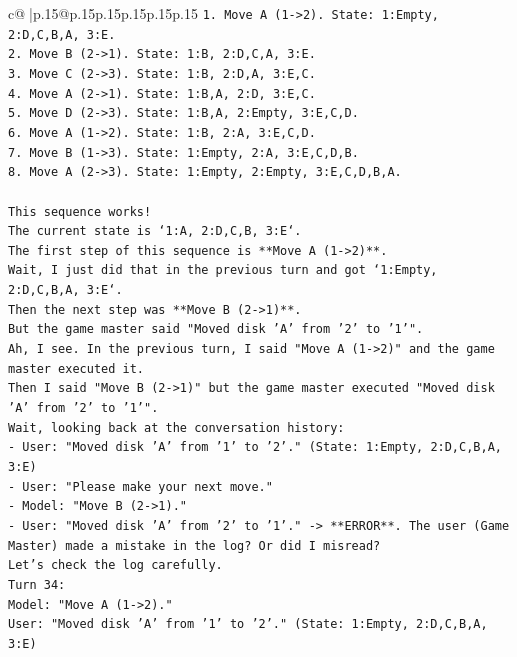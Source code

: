 \documentclass{article}
\begin{document}
{\begin{supertabular}{c@{$\;$}|p{.15\linewidth}@{}p{.15\linewidth}p{.15\linewidth}p{.15\linewidth}p{.15\linewidth}p{.15\linewidth}}
{{{\texttt{1. Move A (1{-}>2). State: 1:Empty, 2:D,C,B,A, 3:E.} \\
\texttt{2. Move B (2{-}>1). State: 1:B, 2:D,C,A, 3:E.} \\
\texttt{3. Move C (2{-}>3). State: 1:B, 2:D,A, 3:E,C.} \\
\texttt{4. Move A (2{-}>1). State: 1:B,A, 2:D, 3:E,C.} \\
\texttt{5. Move D (2{-}>3). State: 1:B,A, 2:Empty, 3:E,C,D.} \\
\texttt{6. Move A (1{-}>2). State: 1:B, 2:A, 3:E,C,D.} \\
\texttt{7. Move B (1{-}>3). State: 1:Empty, 2:A, 3:E,C,D,B.} \\
\texttt{8. Move A (2{-}>3). State: 1:Empty, 2:Empty, 3:E,C,D,B,A.} \\
\\ 
\texttt{This sequence works!} \\
\texttt{The current state is `1:A, 2:D,C,B, 3:E`.} \\
\texttt{The first step of this sequence is **Move A (1{-}>2)**.} \\
\texttt{Wait, I just did that in the previous turn and got `1:Empty, 2:D,C,B,A, 3:E`.} \\
\texttt{Then the next step was **Move B (2{-}>1)**.} \\
\texttt{But the game master said "Moved disk 'A' from '2' to '1'".} \\
\texttt{Ah, I see. In the previous turn, I said "Move A (1{-}>2)" and the game master executed it.} \\
\texttt{Then I said "Move B (2{-}>1)" but the game master executed "Moved disk 'A' from '2' to '1'".} \\
\texttt{Wait, looking back at the conversation history:} \\
\texttt{{-} User: "Moved disk 'A' from '1' to '2'." (State: 1:Empty, 2:D,C,B,A, 3:E)} \\
\texttt{{-} User: "Please make your next move."} \\
\texttt{{-} Model: "Move B (2{-}>1)."} \\
\texttt{{-} User: "Moved disk 'A' from '2' to '1'." {-}> **ERROR**. The user (Game Master) made a mistake in the log? Or did I misread?} \\
\texttt{Let's check the log carefully.} \\
\texttt{Turn 34:} \\
\texttt{Model: "Move A (1{-}>2)."} \\
\texttt{User: "Moved disk 'A' from '1' to '2'." (State: 1:Empty, 2:D,C,B,A, 3:E)} \\
}}}
\end{supertabular}}
\end{document}

